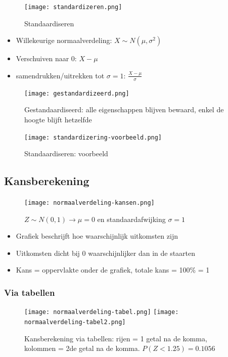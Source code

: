 \documentclass{article}
\begin{document}
\begin{figure}[H]
    \centering
    \texttt{[image: standardizeren.png]}
    \caption{Standaardiseren}
\end{figure}

\begin{itemize}
    \item Willekeurige normaalverdeling: $X \sim N(\mu, \sigma^2)$
    \item Verschuiven naar $0$: $X - \mu$
    \item samendrukken/uitrekken tot $\sigma = 1$: $\frac{X - \mu}{\sigma}$
\end{itemize}


\begin{figure}[H]
    \centering
    \texttt{[image: gestandardizeerd.png]}
    \caption{Gestandaardiseerd: alle eigenschappen blijven bewaard, enkel de hoogte blijft hetzelfde}
\end{figure}


\begin{figure}[H]
    \centering
    \texttt{[image: standardizering-voorbeeld.png]}
    \caption{Standaardiseren: voorbeeld}
\end{figure}

\subsection{Kansberekening}

\begin{figure}[H]
    \centering
    \texttt{[image: normaalverdeling-kansen.png]}
    \caption{$Z \sim N(0, 1) \rightarrow \mu = 0$ en standaardafwijking $\sigma = 1$}
\end{figure}

\begin{itemize}
    \item Grafiek beschrijft hoe waarschijnlijk uitkomsten zijn
    \item Uitkomsten dicht bij 0 waarschijnlijker dan in de staarten
    \item Kans = oppervlakte onder de grafiek, totale kans = 100\% = 1
\end{itemize}

\subsubsection{Via tabellen}

\begin{figure}[H]
    \centering
    \texttt{[image: normaalverdeling-tabel.png]}
    \texttt{[image: normaalverdeling-tabel2.png]}
    \caption{Kansberekening via tabellen: rijen = 1 getal na de komma, kolommen = 2de getal na de komma. $P(Z < 1.25) = 0.1056$}
\end{figure}
\end{document}
